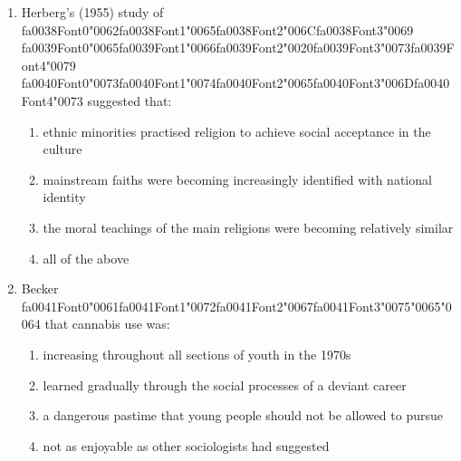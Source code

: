 \documentclass[12pt]{article}
\begin{document}
\begin{enumerate}[label=\arabic*.]
\begin{enumerate}[label=(\alph*)]
    \item the use of corporal punishment by employers
    \item excluding women from participating in waged labour
    \item punctuality, uninterrupted work and the threat of dismissal
    \item making routine tasks less monotonous
\end{enumerate}
\item Herberg's (1955) study of {\csname fa0038Font0\endcsname\char"0062}{\csname fa0038Font1\endcsname\char"0065}{\csname fa0038Font2\endcsname\char"006C}{\csname fa0038Font3\endcsname\char"0069} {\csname fa0039Font0\endcsname\char"0065}{\csname fa0039Font1\endcsname\char"0066}{\csname fa0039Font2\endcsname\char"0020}{\csname fa0039Font3\endcsname\char"0073}{\csname fa0039Font4\endcsname\char"0079} {\csname fa0040Font0\endcsname\char"0073}{\csname fa0040Font1\endcsname\char"0074}{\csname fa0040Font2\endcsname\char"0065}{\csname fa0040Font3\endcsname\char"006D}{\csname fa0040Font4\endcsname\char"0073} suggested that:
\begin{enumerate}[label=(\alph*)]
    \item ethnic minorities practised religion to achieve social acceptance in the culture
    \item mainstream faiths were becoming increasingly identified with national identity
    \item the moral teachings of the main religions were becoming relatively similar
    \item all of the above
\end{enumerate}
\item Becker {\csname fa0041Font0\endcsname\char"0061}{\csname fa0041Font1\endcsname\char"0072}{\csname fa0041Font2\endcsname\char"0067}{\csname fa0041Font3\endcsname\char"0075}{\char"0065}{\char"0064} that cannabis use was:
\begin{enumerate}[label=(\alph*)]
    \item increasing throughout all sections of youth in the 1970s
    \item learned gradually through the social processes of a deviant career
    \item a dangerous pastime that young people should not be allowed to pursue
    \item not as enjoyable as other sociologists had suggested
\end{enumerate}
\end{enumerate}
\end{document}
